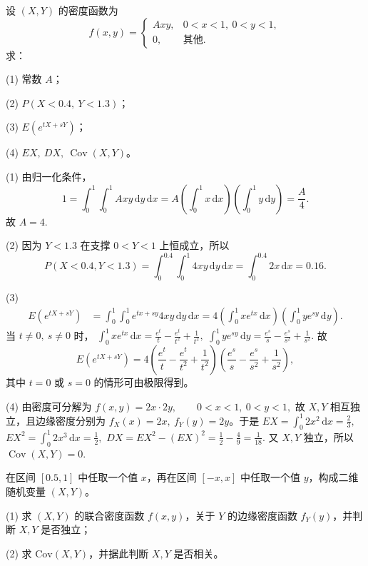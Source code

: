 \documentclass[lang=cn,11pt]{elegantbook}
\begin{document}
\begin{exercise}\label{exer:src-2009-a-09}
设 \((X,Y)\) 的密度函数为
\[
f(x,y)=
\begin{cases}
Axy, & 0<x<1,\ 0<y<1,\\
0, & \text{其他}.
\end{cases}
\]
求：\par
(1) 常数 \(A\)；\par
(2) \(P(X<0.4,\ Y<1.3)\)；\par
(3) \(E(e^{tX+sY})\)；\par
(4) \(EX,\ DX,\ \operatorname{Cov}(X,Y)\)。
\end{exercise}
\begin{solution}
(1) 由归一化条件，
\[
1=\int_0^1\int_0^1 Axy\,\mathrm{d}y\,\mathrm{d}x
=A\left(\int_0^1 x\,\mathrm{d}x\right)\left(\int_0^1 y\,\mathrm{d}y\right)
=\frac{A}{4}.
\]
故
\(
A=4.
\)

(2) 因为 \(Y<1.3\) 在支撑 \(0<Y<1\) 上恒成立，所以
\[
P(X<0.4,Y<1.3)=\int_0^{0.4}\int_0^1 4xy\,\mathrm{d}y\,\mathrm{d}x
=\int_0^{0.4}2x\,\mathrm{d}x=0.16.
\]

(3)
\[
\begin{aligned}
E(e^{tX+sY})
&=\int_0^1\int_0^1 e^{tx+sy}4xy\,\mathrm{d}y\,\mathrm{d}x=4\left(\int_0^1 xe^{tx}\,\mathrm{d}x\right)
\left(\int_0^1 ye^{sy}\,\mathrm{d}y\right).
\end{aligned}
\]
当 \(t\ne0,\ s\ne0\) 时，
\(
\int_0^1 xe^{tx}\,\mathrm{d}x=\frac{e^t}{t}-\frac{e^t}{t^2}+\frac1{t^2},
\)
\(
\int_0^1 ye^{sy}\,\mathrm{d}y=\frac{e^s}{s}-\frac{e^s}{s^2}+\frac1{s^2}.
\)
故
\[
E(e^{tX+sY})
=4\left(\frac{e^t}{t}-\frac{e^t}{t^2}+\frac1{t^2}\right)
\left(\frac{e^s}{s}-\frac{e^s}{s^2}+\frac1{s^2}\right),
\]
其中 \(t=0\) 或 \(s=0\) 的情形可由极限得到。

(4) 由密度可分解为
\(
f(x,y)=2x\cdot2y,\qquad 0<x<1,\ 0<y<1,
\)
故 \(X,Y\) 相互独立，且边缘密度分别为 \(f_X(x)=2x,\ f_Y(y)=2y\)。于是
\(
EX=\int_0^1 2x^2\,\mathrm{d}x=\frac23,
\)
\(
EX^2=\int_0^1 2x^3\,\mathrm{d}x=\frac12,
\)
\(
DX=EX^2-(EX)^2=\frac12-\frac49=\frac1{18}.
\)
又 \(X,Y\) 独立，所以
\(
\operatorname{Cov}(X,Y)=0.
\)
\end{solution}



\begin{exercise}\label{exer:4-19-interval}
在区间 \([0.5, 1]\) 中任取一个值 \(x\)，再在区间 \([-x, x]\) 中任取一个值 \(y\)，构成二维随机变量 \((X,Y)\)。\par
(1) 求 \((X,Y)\) 的联合密度函数 \(f(x,y)\)，关于 \(Y\) 的边缘密度函数 \(f_Y(y)\)，并判断 \(X, Y\) 是否独立；\par
(2) 求 \(\mathrm{Cov}(X,Y)\)，并据此判断 \(X, Y\) 是否相关。
\end{exercise}
\end{document}
